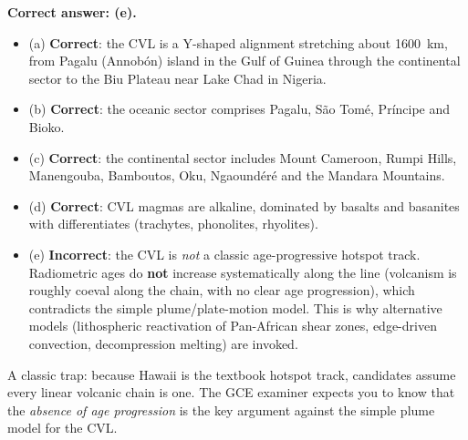 \documentclass[11pt]{article}
\begin{document}
\begin{corrige}
\textbf{Correct answer: (e).}

\begin{itemize}
\item (a) \textbf{Correct}: the CVL is a Y-shaped alignment stretching about \SI{1600}{km}, from Pagalu (Annobón) island in the Gulf of Guinea through the continental sector to the Biu Plateau near Lake Chad in Nigeria.
\item (b) \textbf{Correct}: the oceanic sector comprises Pagalu, São Tomé, Príncipe and Bioko.
\item (c) \textbf{Correct}: the continental sector includes Mount Cameroon, Rumpi Hills, Manengouba, Bamboutos, Oku, Ngaoundéré and the Mandara Mountains.
\item (d) \textbf{Correct}: CVL magmas are alkaline, dominated by basalts and basanites with differentiates (trachytes, phonolites, rhyolites).
\item (e) \textbf{Incorrect}: the CVL is \emph{not} a classic age-progressive hotspot track. Radiometric ages do \textbf{not} increase systematically along the line (volcanism is roughly coeval along the chain, with no clear age progression), which contradicts the simple plume/plate-motion model. This is why alternative models (lithospheric reactivation of Pan-African shear zones, edge-driven convection, decompression melting) are invoked.
\end{itemize}

\begin{attention}
A classic trap: because Hawaii is the textbook hotspot track, candidates assume every linear volcanic chain is one. The GCE examiner expects you to know that the \emph{absence of age progression} is the key argument against the simple plume model for the CVL.
\end{attention}
\end{corrige}
\end{document}
